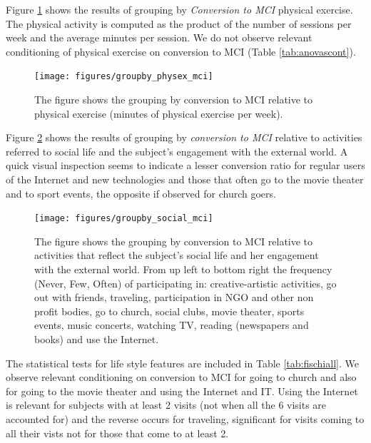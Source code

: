\documentclass[11pt]{article}
\theoremstyle{definition}
\theoremstyle{remark}
\begin{document}
Figure \ref{fig:groupby_physex_mci} shows the results of grouping by \emph{Conversion to MCI} physical exercise. The physical activity is computed as the product of the number of sessions per week and the average minutes per session.
We do not observe relevant conditioning of physical exercise on conversion to MCI (Table \ref{tab:anovascont}).

\begin{figure}[H]
        \centering
        \texttt{[image: figures/groupby\_physex\_mci]}
        \caption{The figure shows the grouping by conversion to MCI relative to physical exercise (minutes of physical exercise per week).} 
        \label{fig:groupby_physex_mci}
\end{figure}

Figure \ref{fig:groupby_social_mci} shows the results of grouping by \emph{conversion to MCI} relative to activities referred to social life and the subject's engagement with the external world. A quick visual inspection seems to indicate a lesser conversion ratio for regular users of the Internet and new technologies and those that often go to the movie theater and to sport events, the opposite if observed for church goers.

\begin{figure}[H]
        \centering
        \texttt{[image: figures/groupby\_social\_mci]}
        \caption{The figure shows the grouping by conversion to MCI relative to activities that reflect the subject's social life and her  engagement with the external world. From up left to bottom right the frequency (Never, Few, Often) of participating in: creative-artistic activities, go out with friends, traveling, participation in NGO and other non profit bodies, go to church,  
        social clubs, movie theater, sports events, music concerts, watching TV, reading (newspapers and books) and use the Internet.}
        \label{fig:groupby_social_mci}
\end{figure}

The statistical tests for life style features are included in Table \ref{tab:fischiall}.
We observe relevant conditioning on conversion to MCI for going to church and also for going to the movie theater and using the Internet and IT.
Using the Internet is relevant for subjects with at least 2 visits (not when all the 6 visits are accounted for) and the reverse occurs for traveling, significant for visits coming to all their vists not for those that come to at least 2.
\end{document}
